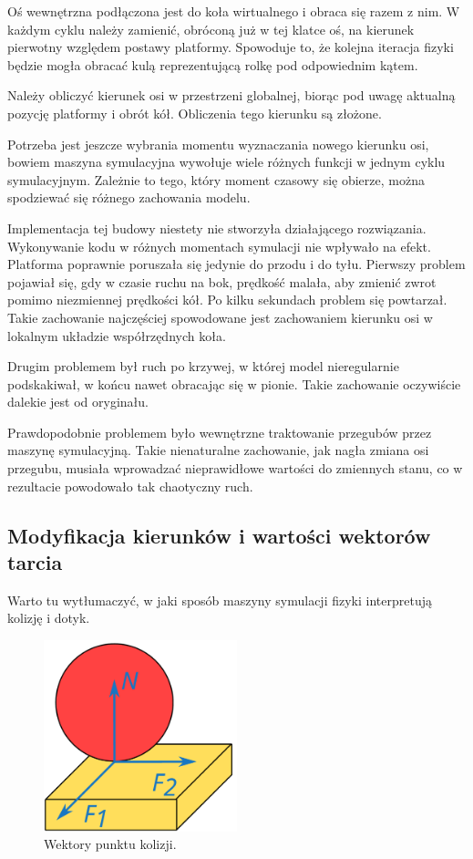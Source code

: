 		Oś wewnętrzna podłączona jest do koła wirtualnego i obraca się razem z nim.
		W każdym cyklu należy zamienić, obróconą już w tej klatce oś, na kierunek pierwotny względem postawy platformy.
		Spowoduje to, że kolejna iteracja fizyki będzie mogła obracać kulą reprezentującą rolkę pod odpowiednim kątem.

		Należy obliczyć kierunek osi w przestrzeni globalnej, biorąc pod uwagę aktualną pozycję platformy i obrót kół.
		Obliczenia tego kierunku są złożone.

		Potrzeba jest jeszcze wybrania momentu wyznaczania nowego kierunku osi, bowiem maszyna symulacyjna wywołuje wiele różnych funkcji w jednym cyklu symulacyjnym.
		Zależnie to tego, który moment czasowy się obierze, można spodziewać się różnego zachowania modelu.

		Implementacja tej budowy niestety nie stworzyła działającego rozwiązania.
		Wykonywanie kodu w różnych momentach symulacji nie wpływało na efekt.
		Platforma poprawnie poruszała się jedynie do przodu i do tyłu. 
		Pierwszy problem pojawiał się, gdy w czasie ruchu na bok, prędkość malała, aby zmienić zwrot pomimo niezmiennej prędkości kół.
		Po kilku sekundach problem się powtarzał. Takie zachowanie najczęściej spowodowane jest zachowaniem kierunku osi w lokalnym układzie współrzędnych koła.

		Drugim problemem był ruch po krzywej, w której model nieregularnie podskakiwał, w końcu nawet obracając się w pionie.
		Takie zachowanie oczywiście dalekie jest od oryginału.

		Prawdopodobnie problemem było wewnętrzne traktowanie przegubów przez maszynę symulacyjną.
		Takie nienaturalne zachowanie, jak nagła zmiana osi przegubu, musiała wprowadzać nieprawidłowe wartości do zmiennych stanu, 
		co w rezultacie powodowało tak chaotyczny ruch.

	\subsection{Modyfikacja kierunków i wartości wektorów tarcia}
		\label{sec:friction}
		Warto tu wytłumaczyć, w jaki sposób maszyny symulacji fizyki interpretują kolizję i dotyk.

		\begin{figure}[H]
		\centering
		\includegraphics[width=0.5\textwidth]{graphics/friction.pdf}
		\caption{Wektory punktu kolizji.}
		\end{figure} 

